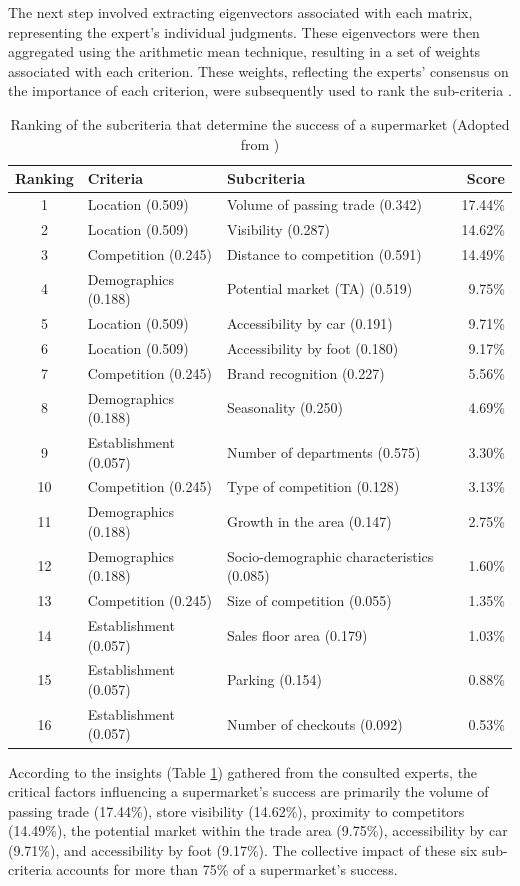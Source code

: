The next step involved extracting eigenvectors associated with each matrix, representing the expert's individual judgments. These eigenvectors were then aggregated using the arithmetic mean technique, resulting in a set of weights associated with each criterion. These weights, reflecting the experts' consensus on the importance of each criterion, were subsequently used to rank the sub-criteria \cite{roig2013retail}.

\begin{table}[ht]
\centering
\begin{tabular}{|c|p{3cm}|p{5cm}|r|}
\hline
\textbf{Ranking} & \textbf{Criteria} & \textbf{Subcriteria} & \textbf{Score} \\
\hline
1 & Location (0.509) & Volume of passing trade (0.342) & 17.44\% \\
2 & Location (0.509) & Visibility (0.287) & 14.62\% \\
3 & Competition (0.245) & Distance to competition (0.591) & 14.49\% \\
4 & Demographics (0.188) & Potential market (TA) (0.519) & 9.75\% \\
5 & Location (0.509) & Accessibility by car (0.191) & 9.71\% \\
6 & Location (0.509) & Accessibility by foot (0.180) & 9.17\% \\
7 & Competition (0.245) & Brand recognition (0.227) & 5.56\% \\
8 & Demographics (0.188) & Seasonality (0.250) & 4.69\% \\
9 & Establishment (0.057) & Number of departments (0.575) & 3.30\% \\
10 & Competition (0.245) & Type of competition (0.128) & 3.13\% \\
11 & Demographics (0.188) & Growth in the area (0.147) & 2.75\% \\
12 & Demographics (0.188) & Socio-demographic characteristics (0.085) & 1.60\% \\
13 & Competition (0.245) & Size of competition (0.055) & 1.35\% \\
14 & Establishment (0.057) & Sales floor area (0.179) & 1.03\% \\
15 & Establishment (0.057) & Parking (0.154) & 0.88\% \\
16 & Establishment (0.057) & Number of checkouts (0.092) & 0.53\% \\
\hline
\end{tabular}
\caption{Ranking of the subcriteria that determine the success of a supermarket (Adopted from \cite{roig2013retail})}
\label{tab:expert-rating}
\end{table}

According to the insights (Table \ref{tab:expert-rating}) gathered from the consulted experts, the critical factors influencing a supermarket's success are primarily the volume of passing trade (17.44\%), store visibility (14.62\%), proximity to competitors (14.49\%), the potential market within the trade area (9.75\%), accessibility by car (9.71\%), and accessibility by foot (9.17\%). The collective impact of these six sub-criteria accounts for more than 75\% of a supermarket's success.

